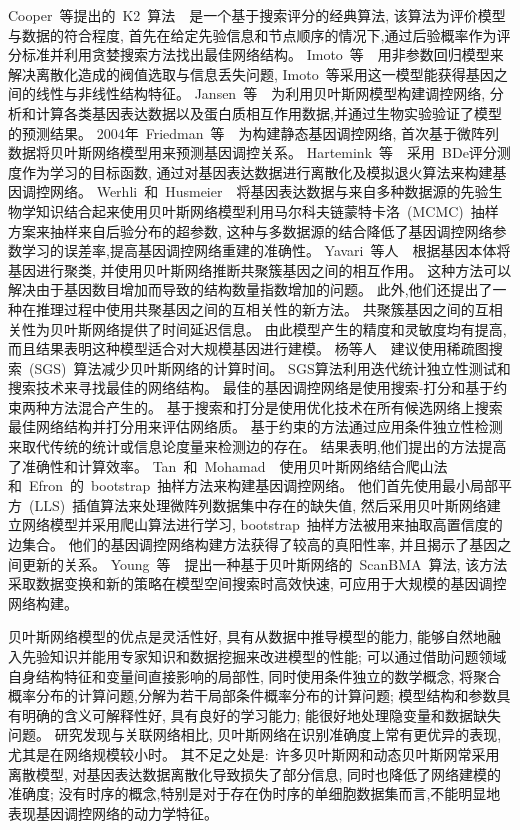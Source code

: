 Cooper~等提出的~K2~算法~\cite{cooper1992bayesian}~是一个基于搜索评分的经典算法,
该算法为评价模型与数据的符合程度,
首先在给定先验信息和节点顺序的情况下,通过后验概率作为评分标准并利用贪婪搜索方法找出最佳网络结构。
Imoto~等~\cite{kim2003inferring}~用非参数回归模型来解决离散化造成的阀值选取与信息丢失问题,
Imoto~等采用这一模型能获得基因之间的线性与非线性结构特征。
Jansen~等~\cite{jansen2003bayesian}~为利用贝叶斯网模型构建调控网络,
分析和计算各类基因表达数据以及蛋白质相互作用数据,并通过生物实验验证了模型的预测结果。
2004年~Friedman~等~\cite{friedman2004inferring}~为构建静态基因调控网络,
首次基于微阵列数据将贝叶斯网络模型用来预测基因调控关系。
Hartemink~等~\cite{hartemink2005reverse}~采用~BDe评分测度作为学习的目标函数,
通过对基因表达数据进行离散化及模拟退火算法来构建基因调控网络。
Werhli~和~Husmeier~\cite{werhli2007reconstructing}~将基因表达数据与来自多种数据源的先验生物学知识结合起来使用贝叶斯网络模型利用马尔科夫链蒙特卡洛~(MCMC)~抽样方案来抽样来自后验分布的超参数,
这种与多数据源的结合降低了基因调控网络参数学习的误差率,提高基因调控网络重建的准确性。
Yavari~等人~\cite{yavari2008gene}~根据基因本体将基因进行聚类,
并使用贝叶斯网络推断共聚簇基因之间的相互作用。
这种方法可以解决由于基因数目增加而导致的结构数量指数增加的问题。 
此外,他们还提出了一种在推理过程中使用共聚基因之间的互相关性的新方法。
共聚簇基因之间的互相关性为贝叶斯网络提供了时间延迟信息。 
由此模型产生的精度和灵敏度均有提高,而且结果表明这种模型适合对大规模基因进行建模。
杨等人~\cite{yang2011bayesian}~建议使用稀疏图搜索~(SGS)~算法减少贝叶斯网络的计算时间。
SGS算法利用迭代统计独立性测试和搜索技术来寻找最佳的网络结构。
最佳的基因调控网络是使用搜索-打分和基于约束两种方法混合产生的。
基于搜索和打分是使用优化技术在所有候选网络上搜索最佳网络结构并打分用来评估网络质。
基于约束的方法通过应用条件独立性检测来取代传统的统计或信息论度量来检测边的存在。
结果表明,他们提出的方法提高了准确性和计算效率。
Tan~和~Mohamad~\cite{kunga2012using}~使用贝叶斯网络结合爬山法和~Efron~的~bootstrap~抽样方法来构建基因调控网络。
他们首先使用最小局部平方~(LLS)~插值算法来处理微阵列数据集中存在的缺失值, 
然后采用贝叶斯网络建立网络模型并采用爬山算法进行学习, 
bootstrap~抽样方法被用来抽取高置信度的边集合。
他们的基因调控网络构建方法获得了较高的真阳性率, 并且揭示了基因之间更新的关系。 
Young~等~\cite{young2014fast}~提出一种基于贝叶斯网络的~ScanBMA~算法,
该方法采取数据变换和新的策略在模型空间搜索时高效快速,
可应用于大规模的基因调控网络构建。

贝叶斯网络模型的优点是灵活性好, 具有从数据中推导模型的能力, 能够自然地融入先验知识并能用专家知识和数据挖掘来改进模型的性能;
可以通过借助问题领域自身结构特征和变量间直接影响的局部性, 同时使用条件独立的数学概念, 将聚合概率分布的计算问题,分解为若干局部条件概率分布的计算问题;
模型结构和参数具有明确的含义可解释性好, 具有良好的学习能力; 能很好地处理隐变量和数据缺失问题。
研究发现与关联网络相比, 贝叶斯网络在识别准确度上常有更优异的表现, 尤其是在网络规模较小时。
其不足之处是:~许多贝叶斯网和动态贝叶斯网常采用离散模型, 对基因表达数据离散化导致损失了部分信息,
同时也降低了网络建模的准确度;
没有时序的概念,特别是对于存在伪时序的单细胞数据集而言,不能明显地表现基因调控网络的动力学特征。

